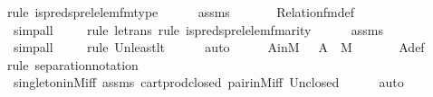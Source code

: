 \begin{isabellebody}
{\isacharparenleft}{\kern0pt}rule\ is{\isacharunderscore}{\kern0pt}preds{\isacharunderscore}{\kern0pt}prel{\isacharunderscore}{\kern0pt}elem{\isacharunderscore}{\kern0pt}fm{\isacharunderscore}{\kern0pt}type{\isacharparenright}{\kern0pt}\isanewline
\ \ \ \ \isamarkupfalse%
\ assms\ \isanewline
\ \ \ \ \isamarkupfalse%
\ Relation{\isacharunderscore}{\kern0pt}fm{\isacharunderscore}{\kern0pt}def\isanewline
\ \ \ \ \ \ \ \ \ \isamarkupfalse%
\ simp{\isacharunderscore}{\kern0pt}all\isanewline
\ \ \ \ \isamarkupfalse%
{\isacharparenleft}{\kern0pt}rule\ le{\isacharunderscore}{\kern0pt}trans{\isacharcomma}{\kern0pt}\ rule\ is{\isacharunderscore}{\kern0pt}preds{\isacharunderscore}{\kern0pt}prel{\isacharunderscore}{\kern0pt}elem{\isacharunderscore}{\kern0pt}fm{\isacharunderscore}{\kern0pt}arity{\isacharparenright}{\kern0pt}\isanewline
\ \ \ \ \isamarkupfalse%
\ assms\isanewline
\ \ \ \ \ \ \ \ \ \isamarkupfalse%
\ simp{\isacharunderscore}{\kern0pt}all\isanewline
\ \ \ \ \isamarkupfalse%
{\isacharparenleft}{\kern0pt}rule\ Un{\isacharunderscore}{\kern0pt}least{\isacharunderscore}{\kern0pt}lt{\isacharparenright}{\kern0pt}{\isacharplus}{\kern0pt}\isanewline
\ \ \ \ \isamarkupfalse%
\ auto\isanewline
\isanewline
\ \ \isamarkupfalse%
\ \isamarkupfalse%
\ AinM\ {\isacharcolon}{\kern0pt}\ \ {\isachardoublequoteopen}A\ {\isasymin}\ M{\isachardoublequoteclose}\ \isanewline
\ \ \ \ \isamarkupfalse%
\ A{\isacharunderscore}{\kern0pt}def\ \isanewline
\ \ \ \ \isamarkupfalse%
{\isacharparenleft}{\kern0pt}rule\ separation{\isacharunderscore}{\kern0pt}notation{\isacharparenright}{\kern0pt}\isanewline
\ \ \ \ \isamarkupfalse%
\ singleton{\isacharunderscore}{\kern0pt}in{\isacharunderscore}{\kern0pt}M{\isacharunderscore}{\kern0pt}iff\ assms\ cartprod{\isacharunderscore}{\kern0pt}closed\ pair{\isacharunderscore}{\kern0pt}in{\isacharunderscore}{\kern0pt}M{\isacharunderscore}{\kern0pt}iff\ Un{\isacharunderscore}{\kern0pt}closed\isanewline
\ \ \ \ \isamarkupfalse%
\ auto\ \isanewline
\isanewline
\ \ \isamarkupfalse%

\end{isabellebody}
